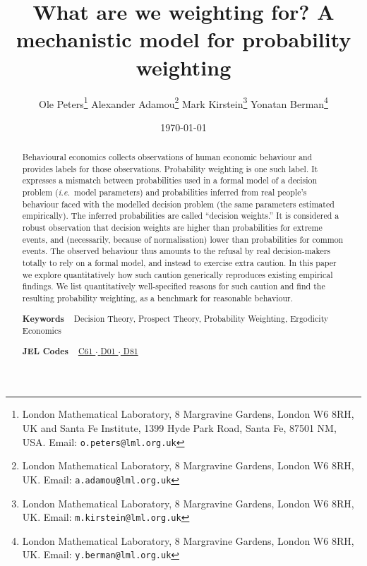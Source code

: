 \documentclass[a4paper, 12pt]{article}
\title{What are we weighting for? A mechanistic model for probability weighting}
\author{
Ole Peters\footnote{London Mathematical Laboratory, 8 Margravine Gardens, London W6 8RH, UK and Santa Fe Institute, 1399 Hyde Park Road, Santa Fe, 87501 NM, USA. Email: \texttt{o.peters@lml.org.uk}} \;
Alexander Adamou\footnote{London Mathematical Laboratory, 8 Margravine Gardens, London W6 8RH, UK. Email: \texttt{a.adamou@lml.org.uk}} \;
Mark Kirstein\footnote{London Mathematical Laboratory, 8 Margravine Gardens, London W6 8RH, UK. Email: \texttt{m.kirstein@lml.org.uk}} \;
Yonatan Berman\footnote{London Mathematical Laboratory, 8 Margravine Gardens, London W6 8RH, UK. Email: \texttt{y.berman@lml.org.uk}} 
}
\date{\today}
\newcommand{\ie}{{\it i.e.}\ }
\begin{document}
\begin{titlepage}
	\maketitle
\thispagestyle{fancy}

\begin{abstract}
\noindent 
Behavioural economics collects observations of human economic behaviour and provides labels for those observations. 
Probability weighting is one such label. It expresses a mismatch between probabilities used in a formal model of a decision problem (\ie model parameters) and probabilities inferred from real people's behaviour faced with the modelled decision problem (the same parameters estimated empirically). The inferred probabilities are called ``decision weights.'' 
It is considered a robust observation that decision weights are higher than probabilities for extreme events, and (necessarily, because of normalisation) lower than probabilities for common events.
The observed behaviour thus amounts to the refusal by real decision-makers totally to rely on a formal model, and instead to exercise extra caution. In this paper we explore quantitatively how such caution generically reproduces existing empirical findings. We list quantitatively well-specified reasons for such caution and find the resulting probability weighting, as a benchmark for reasonable behaviour.

\vspace{1em}

\noindent\textsf{\textbf{Keywords}} ~ Decision Theory, Prospect Theory, Probability Weighting, Ergodicity Economics
\vspace{.5em}

\noindent\textsf{\textbf{JEL Codes}} ~
\href{https://www.aeaweb.org/econlit/jelCodes.php?view=jel#C}{%
C61		%
$\cdot$
}%
\href{https://www.aeaweb.org/econlit/jelCodes.php?view=jel#D}{%
D01 	%
$\cdot$
D81 	%
}
\end{abstract}
\end{titlepage}

 
\end{document}
